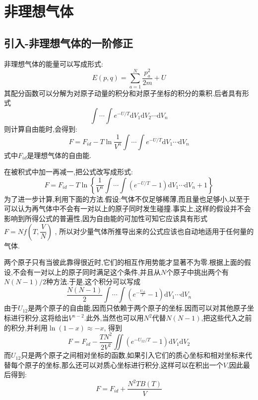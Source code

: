 

\section{非理想气体}
\subsection{引入-非理想气体的一阶修正}

  非理想气体的能量可以写成形式:
  \begin{equation}
    E(p,q)=\sum_{a=1}^{N} \dfrac{p_a^{2}}{2m}+U
  \end{equation}
  其配分函数可以分解为对原子动量的积分和对原子坐标的积分的乘积.后者具有形式
  \[\int \cdots \int e^{-U / T}\mathrm{d} V_1 \mathrm{d} V_2 \cdots \mathrm{d} V_n\]
  则计算自由能时,会得到:
  \begin{equation}
    F=F_{id}-T\ln \frac{1}{V^{n}}\int\cdots \int e^{-U / T}\mathrm{d} V_1 \cdots \mathrm{d}  V_n
  \end{equation}
  式中$F_{id}$是理想气体的自由能.

  在被积式中加一再减一,把公式改写成形式:
  \begin{equation}
    F=F_{id}-T\ln\left\{ \frac{1}{V^{n}} \int \cdots \int (e^{-U / T}-1)\mathrm{d} V_1 \cdots\mathrm{d} V_n +1 \right\} 
  \end{equation}
  为了进一步计算,利用下面的方法.假设:气体不仅足够稀薄,而且量也足够小,以至于可以认为再气体中不会有一对以上的原子同时发生碰撞.事实上,这样的假设并不会影响到所得公式的普遍性,因为自由能的可加性可知它应该具有形式$F=N f\left( T,\dfrac{V}{N} \right) $ , 所以对少量气体所推导出来的公式应该也自动地适用于任何量的气体.

  两个原子只有当彼此靠得很近时,它们的相互作用势能才显著不为零.根据上面的假设,不会有一对以上的原子同时满足这个条件,并且从$N$个原子中挑出两个有$N(N-1)/2$种方法.于是,这个积分可以写成
  \[\dfrac{N(N-1)}{2}\int \cdots \int (e^{-\frac{U_{12}}{T}}-1)\mathrm{d} V_1 \cdots\mathrm{d} V_n\]
  由于$U_{12}$是两个原子的自由能,因而只依赖于两个原子的坐标.因而可以对其他原子坐标进行积分,这将给出$V^{n-2}$.此外,当然也可以用$N^{2}$代替$N(N-1)$,把这些代入之前的积分,并利用$\ln(1-x)\approx -x$, 得到
  \begin{equation}
    F=F_{id}-\dfrac{TN^{2}}{2V^{2}} \iint (e^{-U_{12} / T}-1)\mathrm{d} V_1 \mathrm{d} V_2
  \end{equation}
  而$U_{12}$只是两个原子之间相对坐标的函数,如果引入它们的质心坐标和相对坐标来代替每个原子的坐标,那么还可以对质心坐标进行积分,这样可以在积出一个$V$,因此最后得到:
  \begin{equation}
    F=F_{id}+\dfrac{N^{2}TB(T)}{V}
  \end{equation}
  
